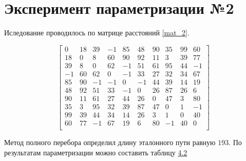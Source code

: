 \section {Эксперимент параметризации №2}
Иследование проводилось по матрице расстояний \ref{mat_2}. 
\begin{scriptsize} \begin{equation}\label{mat_2}
	\left[\begin{array}{cccccccccc}
		0 &     18 &    39 &    -1 &    85 &    48 &    90 &    35 &    99 &    60 \\
		18 &    0 &     8 &     60 &    90 &    92 &    11 &    3 &     39 &    77 \\
		39 &    8 &     0 &     62 &    -1 &    51 &    61 &    95 &    44 &    -1 \\
		-1 &    60 &    62 &    0 &     -1 &    33 &    27 &    32 &    34 &    67 \\
		85 &    90 &    -1 &    -1 &    0 &     -1 &    44 &    39 &    14 &    19 \\
		48 &    92 &    51 &    33 &    -1 &    0 &     26 &    87 &    26 &    6 \\
		90 &    11 &    61 &    27 &    44 &    26 &    0 &     47 &    3 &     80 \\
		35 &    3 &     95 &    32 &    39 &    87 &    47 &    0 &     1 &     -1 \\
		99 &    39 &    44 &    34 &    14 &    26 &    3 &     1 &     0 &     40 \\
		60 &    77 &    -1 &    67 &    19 &    6 &     80 &    -1 &    40 &    0 \\
	\end{array}\right]
\end{equation} \end{scriptsize}

Метод полного перебора определил длину эталонного пути равную $193$. По результатам параметризации  можно составить таблицу \hyperref[table_4_2]{4.2}


